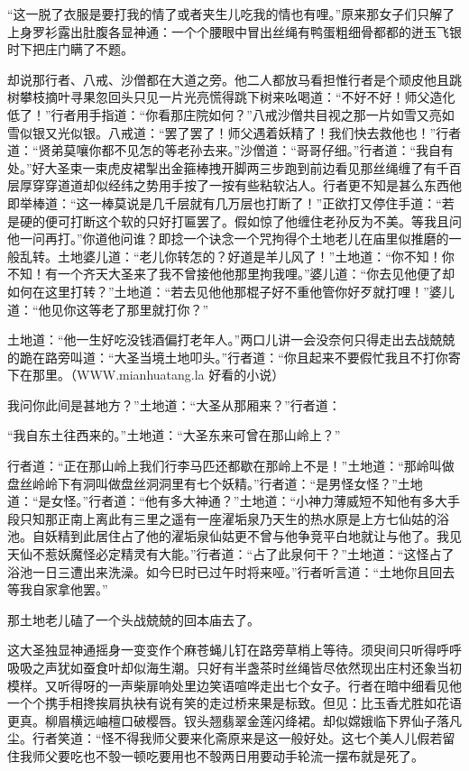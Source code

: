 \documentclass[12pt,UTF8]{ctexbook}
\begin{document}
“这一脱了衣服是要打我的情了或者夹生儿吃我的情也有哩。”原来那女子们只解了上身罗衫露出肚腹各显神通：一个个腰眼中冒出丝绳有鸭蛋粗细骨都都的迸玉飞银时下把庄门瞒了不题。

却说那行者、八戒、沙僧都在大道之旁。他二人都放马看担惟行者是个顽皮他且跳树攀枝摘叶寻果忽回头只见一片光亮慌得跳下树来吆喝道：“不好不好！师父造化低了！”行者用手指道：“你看那庄院如何？”八戒沙僧共目视之那一片如雪又亮如雪似银又光似银。八戒道：“罢了罢了！师父遇着妖精了！我们快去救他也！”行者道：“贤弟莫嚷你都不见怎的等老孙去来。”沙僧道：“哥哥仔细。”行者道：“我自有处。”好大圣束一束虎皮裙掣出金箍棒拽开脚两三步跑到前边看见那丝绳缠了有千百层厚穿穿道道却似经纬之势用手按了一按有些粘软沾人。行者更不知是甚么东西他即举棒道：“这一棒莫说是几千层就有几万层也打断了！”正欲打又停住手道：“若是硬的便可打断这个软的只好打匾罢了。假如惊了他缠住老孙反为不美。等我且问他一问再打。”你道他问谁？即捻一个诀念一个咒拘得个土地老儿在庙里似推磨的一般乱转。土地婆儿道：“老儿你转怎的？好道是羊儿风了！”土地道：“你不知！你不知！有一个齐天大圣来了我不曾接他他那里拘我哩。”婆儿道：“你去见他便了却如何在这里打转？”土地道：“若去见他他那棍子好不重他管你好歹就打哩！”婆儿道：“他见你这等老了那里就打你？”

土地道：“他一生好吃没钱酒偏打老年人。”两口儿讲一会没奈何只得走出去战兢兢的跪在路旁叫道：“大圣当境土地叩头。”行者道：“你且起来不要假忙我且不打你寄下在那里。（WWW.mianhuatang.la 好看的小说）

我问你此间是甚地方？”土地道：“大圣从那厢来？”行者道：

“我自东土往西来的。”土地道：“大圣东来可曾在那山岭上？”

行者道：“正在那山岭上我们行李马匹还都歇在那岭上不是！”土地道：“那岭叫做盘丝岭岭下有洞叫做盘丝洞洞里有七个妖精。”行者道：“是男怪女怪？”土地道：“是女怪。”行者道：“他有多大神通？”土地道：“小神力薄威短不知他有多大手段只知那正南上离此有三里之遥有一座濯垢泉乃天生的热水原是上方七仙姑的浴池。自妖精到此居住占了他的濯垢泉仙姑更不曾与他争竞平白地就让与他了。我见天仙不惹妖魔怪必定精灵有大能。”行者道：“占了此泉何干？”土地道：“这怪占了浴池一日三遭出来洗澡。如今巳时已过午时将来哑。”行者听言道：“土地你且回去等我自家拿他罢。”

那土地老儿磕了一个头战兢兢的回本庙去了。

这大圣独显神通摇身一变变作个麻苍蝇儿钉在路旁草梢上等待。须臾间只听得呼呼吸吸之声犹如蚕食叶却似海生潮。只好有半盏茶时丝绳皆尽依然现出庄村还象当初模样。又听得呀的一声柴扉响处里边笑语喧哗走出七个女子。行者在暗中细看见他一个个携手相搀挨肩执袂有说有笑的走过桥来果是标致。但见：比玉香尤胜如花语更真。柳眉横远岫檀口破樱唇。钗头翘翡翠金莲闪绛裙。却似嫦娥临下界仙子落凡尘。行者笑道：“怪不得我师父要来化斋原来是这一般好处。这七个美人儿假若留住我师父要吃也不彀一顿吃要用也不彀两日用要动手轮流一摆布就是死了。
\end{document}
